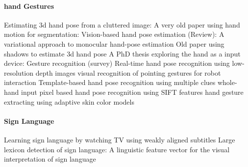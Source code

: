 \paragraph{hand Gestures}
Estimating 3d hand pose from a cluttered image: \cite{Athitsos2003}
A very old paper using hand motion for segmentation: \cite{Cui1996}
Vision-based hand pose estimation (Review): \cite{Erol2007}
A variational approach to monocular hand-pose estimation \cite{laGorce2010}
Old paper using shadows to estimate 3d hand pose \cite{Segen1999}
A PhD thesis exploring the hand as a input device: \cite{Sturman1992}
Gesture recognition (survey) \cite{Mitra2007}
Real-time hand pose recognition using low-resolution depth images \cite{Mo2006}
visual recognition of pointing gestures for robot interaction \cite{Nickel2007}
Template-based hand pose recognition using multiple clues \cite{Stenger2006}
whole-hand input \cite{Sturman1992}
pixel based hand pose recognition using SIFT features \cite{Wang2007}
hand gesture extracting using adaptive skin color models \cite{Xiong2006}

\paragraph{Sign Language}
Learning sign language by watching TV using weakly aligned subtitles \cite{Buehler2009}
Large lexicon detection of sign language: \cite{Cooper2007}
A linguistic feature vector for the visual interpretation of sign language \cite{RichardBowden2004}







